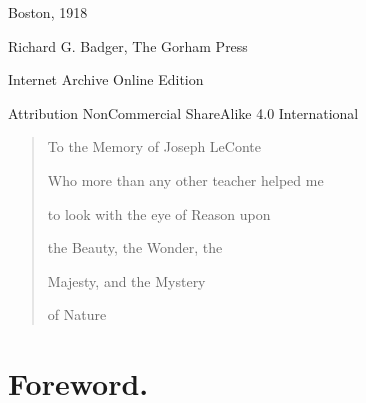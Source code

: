 \documentclass[a4paper, 11pt, oneside, polutonikogreek, english]{article}
\begin{document}
\begin{titlepage}
	
	
		
	\vspace*{\fill}%
	
	{Boston, 1918} %
 
        {\small Richard G. Badger, The Gorham Press}

	\vspace{1\baselineskip} %

        Internet Archive Online Edition  %
	
	{\small Attribution NonCommercial ShareAlike 4.0 International } %
\end{titlepage}
\clearpage
\Large
\setlength{\parskip}{1mm plus1mm minus1mm}
\tableofcontents
\clearpage
\vspace*{\fill}
\begin{quotation}
\begin{center}
To the Memory of Joseph LeConte

Who more than any other teacher helped me

to look with the eye of Reason upon

the Beauty, the Wonder, the

Majesty, and the Mystery

of Nature
\end{center}
\end{quotation}
\vspace*{\fill}
\clearpage
\section*{Foreword.}
\end{document}
